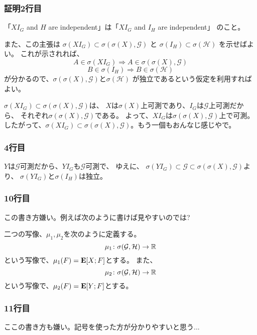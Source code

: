       \subsubsection{証明2行目}
        「$XI_G$ and $H$ are independent」は「$XI_G$ and $I_H$ are independent」
        のこと。

        また、この主張は
        $\sigma(XI_G) \subset \sigma(\sigma(X), \mathcal{G})$
        と
        $\sigma(I_H) \subset \sigma(\mathcal{H})$
        を示せばよい。
        これが示されれば、
        \[
          A \in \sigma(XI_G) \Rightarrow A \in \sigma(\sigma(X), \mathcal{G})
        \]
        \[
          B \in \sigma(I_H) \Rightarrow B \in \sigma(\mathcal{H})
        \]
        が分かるので、$\sigma(\sigma(X), \mathcal{G})$と$\sigma(\mathcal{H})$
        が独立であるという仮定を利用すればよい。

        $\sigma(XI_G) \subset \sigma(\sigma(X), \mathcal{G})$は、
        $X$は$\sigma(X)$上可測であり、$I_G$は$\mathcal{G}$上可測だから、
        それぞれ$\sigma(\sigma(X), \mathcal{G})$である。
        よって、$XI_G$は$\sigma(\sigma(X), \mathcal{G})$上で可測。
        したがって、$\sigma(XI_G) \subset \sigma(\sigma(X), \mathcal{G})$。もう一個もおんなじ感じやで。

      \subsubsection{4行目}
        $Y$は$\mathcal{G}$可測だから、$YI_G$も$\mathcal{G}$可測で、
        ゆえに、
        $\sigma(YI_G) \subset \mathcal{G} \subset \sigma(\sigma(X),\mathcal{G})$より、
        $\sigma(YI_G)$と$\sigma(I_H)$は独立。

      \subsubsection{10行目}
        この書き方嫌い。例えば次のように書けば見やすいのでは?

        二つの写像、$\mu_1, \mu_2$を次のように定義する。
        \[
        \mu_1 \colon \sigma(\mathcal{G},\mathcal{H}) \rightarrow {\mathbb{R}}
        \]
        という写像で、$\mu_1(F) = {\mathbf{E}}[X ; F]$とする。
        また、
        \[
        \mu_2 \colon \sigma(\mathcal{G},\mathcal{H}) \rightarrow {\mathbb{R}}
        \]
        という写像で、$\mu_2(F) = {\mathbf{E}}[Y ; F]$とする。

      \subsubsection{11行目}
        ここの書き方も嫌い。記号を使った方が分かりやすいと思う...

